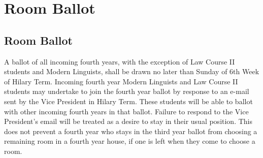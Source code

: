 \chapter{Room Ballot}\label{App:RoomBallot}

\section{Room Ballot}

\npara A ballot of all incoming fourth years, with the exception of Law Course II students and Modern Linguists, shall be drawn no later than Sunday of 6th Week of Hilary Term. Incoming fourth year Modern Linguists and Law Course II students may undertake to join the fourth year ballot by response to an e-mail sent by the Vice President in Hilary Term. These students will be able to ballot with other incoming fourth years in that ballot. Failure to respond to the Vice President's email will be treated as a desire to stay in their usual position. This does not prevent a fourth year who stays in the third year ballot from choosing a remaining room in a fourth year house, if one is left when they come to choose a room.

